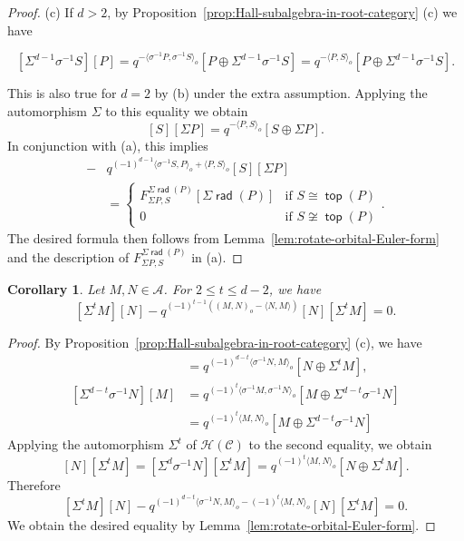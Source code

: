\documentclass[reqno,12pt,a4paper]{amsart}
\newtheorem{corollary}[theorem]{Corollary}
\theoremstyle{remark}
\theoremstyle{definition}
\newcommand{\opname}[1]{\operatorname{\mathsf{#1}}}
\newcommand{\rad}{\opname{rad}\nolimits}
\renewcommand{\top}{\opname{top}\nolimits}
\newcommand{\ca}{{\mathcal A}}
\newcommand{\cc}{{\mathcal C}}
\newcommand{\ch}{{\mathcal H}}
\numberwithin{equation}{section}
\begin{document}
\begin{proof}
(c) If $d>2$, by Proposition~\ref{prop:Hall-subalgebra-in-root-category} (c) we have

\[[\Sigma^{d-1} \sigma^{-1}S][P]=q^{-\langle \sigma^{-1}P,\sigma^{-1}S\rangle_o}[P\oplus\Sigma^{d-1} \sigma^{-1}S]=q^{-\langle P,S\rangle_o}[P\oplus\Sigma^{d-1} \sigma^{-1}S].\]

This is also true for $d=2$ by (b) under the extra assumption.  Applying the automorphism $\Sigma$ to this equality we obtain
\[
[S][\Sigma P]=q^{-\langle P,S\rangle_o}[S\oplus\Sigma P].
\]
In conjunction with (a), this implies
\begin{align*}
[\Sigma P][S]-&q^{(-1)^{d-1}\langle \sigma^{-1}S,P\rangle_o+\langle P,S\rangle_o}[S][\Sigma P]\\
&=
\begin{cases} F_{\Sigma P,S}^{\Sigma\rad(P)}[\Sigma \rad(P)] & \text{if }S\cong \top(P)\\
0 &\text{if }S\not\cong \top(P)
\end{cases}.
\end{align*}
The desired formula then follows from Lemma~\ref{lem:rotate-orbital-Euler-form} and the description of $F_{\Sigma P,S}^{\Sigma\rad(P)}$ in (a).
\end{proof}


\begin{corollary}
\label{cor:commutator-for-pieces-faraway}
Let $M,N\in\ca$. For $2\leq t\leq d-2$, we have
\[
[\Sigma^t M][N]-q^{(-1)^{t-1}((M,N)_o-\langle N,M\rangle)}[N][\Sigma^t M]=0.
\]
\end{corollary}
\begin{proof}
By Proposition~\ref{prop:Hall-subalgebra-in-root-category} (c), we have
\begin{align*}
[\Sigma^t M][N]&=q^{(-1)^{d-t}\langle \sigma^{-1}N,M\rangle_o}[N\oplus\Sigma^t M],\\
[\Sigma^{d-t}\sigma^{-1}N][M]&=q^{(-1)^{t}\langle \sigma^{-1}M,\sigma^{-1}N\rangle_o}[M\oplus\Sigma^{d-t} \sigma^{-1}N]\\
&=q^{(-1)^{t}\langle M,N\rangle_o}[M\oplus\Sigma^{d-t} \sigma^{-1}N]
\end{align*}
Applying the automorphism $\Sigma^t$ of $\ch(\cc)$ to the second equality, we obtain
\[
[N][\Sigma^t M]=[\Sigma^d\sigma^{-1}N][\Sigma^t M]=q^{(-1)^{t}\langle M,N\rangle_o}[N\oplus\Sigma^t M].
\]
Therefore
\[
[\Sigma^t M][N]-q^{(-1)^{d-t}\langle \sigma^{-1}N,M\rangle_o-(-1)^{t}\langle M,N\rangle_o}[N][\Sigma^t M]=0.
\]
We obtain the desired equality by Lemma~\ref{lem:rotate-orbital-Euler-form}.
\end{proof}
\end{document}
